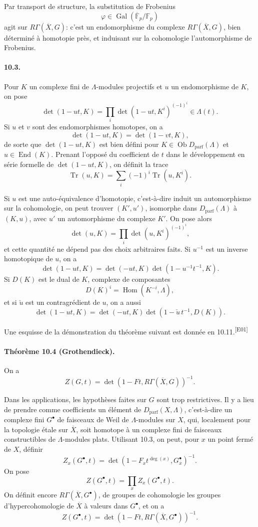 \documentclass[10pt,letterpaper]{article}
\newcommand{\F}{\mathbb F}
\newcommand{\Gal}{\operatorname{Gal}}
\newcommand{\Hom}{\operatorname{Hom}}
\newcommand{\Tr}{\operatorname{Tr}}
\providecommand{\Gal}{\operatorname{Gal}}
\providecommand{\Hom}{\operatorname{Hom}}
\providecommand{\End}{\operatorname{End}}
\providecommand{\Gal}{\operatorname{Gal}}
\providecommand{\Hom}{\operatorname{Hom}}
\providecommand{\Tr}{\operatorname{Tr}}
\providecommand{\Dparf}{D_{\mathrm{parf}}}
\providecommand{\Gal}{\operatorname{Gal}}
\providecommand{\Hom}{\operatorname{Hom}}
\providecommand{\End}{\operatorname{End}}
\providecommand{\Tr}{\operatorname{Tr}}
\providecommand{\Gal}{\operatorname{Gal}}
\providecommand{\Tr}{\operatorname{Tr}}
\newcommand{\auditmark}[1]{\textsuperscript{\normalfont\scriptsize[E#1]}}
\begin{document}
Par transport de structure, la substitution de Frobenius
\[
\varphi\in\Gal(\overline{\F}_p/\F_p)
\]
agit sur \(R\Gamma(\overline X,G)\): c'est un endomorphisme du complexe \(R\Gamma(\overline X,G)\), bien déterminé à homotopie près, et induisant sur la cohomologie l'automorphisme de Frobenius.

\paragraph{10.3.} Pour \(K\) un complexe fini de \(\Lambda\)-modules projectifs et \(u\) un endomorphisme de \(K\), on pose
\[
\tag{10.3.1}
\det(1-ut,K)=
\prod_i\det(1-ut,K^i)^{(-1)^i}\in\Lambda(t).
\]
Si \(u\) et \(v\) sont des endomorphismes homotopes, on a
\[
\det(1-ut,K)=\det(1-vt,K),
\]
de sorte que \(\det(1-ut,K)\) est bien défini pour \(K\in\operatorname{Ob}\Dparf(\Lambda)\) et \(u\in\End(K)\). Prenant l'opposé du coefficient de \(t\) dans le développement en série formelle de \(\det(1-ut,K)\), on définit la trace
\[
\tag{10.3.2}
\Tr(u,K)=\sum_i(-1)^i\Tr(u,K^i).
\]

Si \(u\) est une auto-équivalence d'homotopie, c'est-à-dire induit un automorphisme sur la cohomologie, on peut trouver \((K',u')\), isomorphe dans \(\Dparf(\Lambda)\) à \((K,u)\), avec \(u'\) un automorphisme du complexe \(K'\). On pose alors
\[
\tag{10.3.3}
\det(u,K)=\prod_i\det(u,K^i)^{(-1)^i},
\]
et cette quantité ne dépend pas des choix arbitraires faits. Si \(u^{-1}\) est un inverse homotopique de \(u\), on a
\[
\tag{10.3.4}
\det(1-ut,K)=\det(-ut,K)\det(1-u^{-1}t^{-1},K).
\]
Si \(D(K)\) est le dual de \(K\), complexe de composantes
\[
D(K)^i=\Hom(K^{-i},\Lambda),
\]
et si \(\check u\) est un contragrédient de \(u\), on a aussi
\[
\tag{10.3.5}
\det(1-ut,K)=\det(-ut,K)\det(1-\check u\,t^{-1},D(K)).
\]

Une esquisse de la démonstration du théorème suivant est donnée en 10.11.\auditmark{01}

\paragraph{Théorème 10.4 (Grothendieck).} On a
\[
\tag{10.4.1}
Z(G,t)=\det(1-Ft,R\Gamma(\overline X,G))^{-1}.
\]

Dans les applications, les hypothèses faites sur \(G\) sont trop restrictives. Il y a lieu de prendre comme coefficients un élément de \(\Dparf(X,\Lambda)\), c'est-à-dire un complexe fini \(G^\bullet\) de faisceaux de Weil de \(\Lambda\)-modules sur \(X\), qui, localement pour la topologie étale sur \(\overline X\), soit homotope à un complexe fini de faisceaux constructibles de \(\Lambda\)-modules plats. Utilisant 10.3, on peut, pour \(x\) un point fermé de \(X\), définir
\[
Z_x(G^\bullet,t)=
\det(1-F_x t^{\deg(x)},G_{\overline x}^\bullet)^{-1}.
\]
On pose
\[
Z(G^\bullet,t)=\prod_x Z_x(G^\bullet,t).
\]
On définit encore \(R\Gamma(\overline X,G^\bullet)\), de groupes de cohomologie les groupes d'hypercohomologie de \(\overline X\) à valeurs dans \(G^\bullet\), et on a
\[
\tag{10.4.2}
Z(G^\bullet,t)=
\det(1-Ft,R\Gamma(\overline X,G^\bullet))^{-1}.
\]
\end{document}
